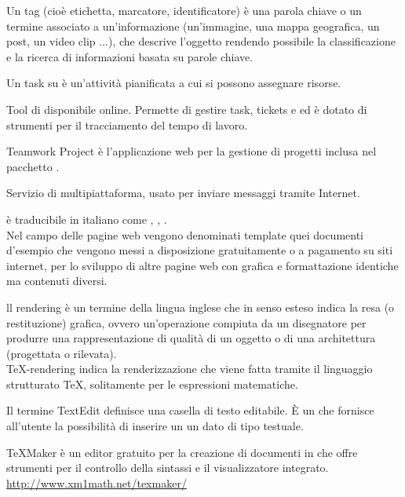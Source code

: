 Un tag (cioè etichetta, marcatore, identificatore) è una parola chiave o un termine associato a un'informazione (un'immagine, una mappa geografica, un post, un video clip ...), che descrive l'oggetto rendendo possibile la classificazione e la ricerca di informazioni basata su parole chiave.

Un task su  è un’attività pianificata a cui si possono assegnare risorse.

Tool di  disponibile online. Permette di gestire  task, tickets e  ed è dotato di strumenti per il tracciamento del tempo di lavoro.

Teamwork Project è l’applicazione web per la gestione di progetti inclusa nel pacchetto .

Servizio di  multipiattaforma, usato per inviare messaggi tramite Internet.

 è traducibile in italiano come , , .\\
Nel campo delle pagine web vengono denominati template quei documenti d'esempio che vengono messi a disposizione gratuitamente o a pagamento su siti internet, per lo sviluppo di altre pagine web con grafica e formattazione identiche ma contenuti diversi.

ll rendering è un termine della lingua inglese che in senso esteso indica la resa (o restituzione) grafica, ovvero un'operazione compiuta da un disegnatore per produrre una rappresentazione di qualità di un oggetto o di una architettura (progettata o rilevata).\\
\TeX -rendering indica la renderizzazione che viene fatta tramite il linguaggio strutturato \TeX, solitamente per le espressioni matematiche.

Il termine TextEdit definisce una casella di testo editabile. È un  che fornisce all’utente la possibilità di inserire un un dato di tipo testuale.

TeXMaker è un editor gratuito per la creazione di documenti in \glossario{\LaTeX} che offre strumenti per il controllo della sintassi e il visualizzatore integrato.\\
\url{http://www.xm1math.net/texmaker/}

